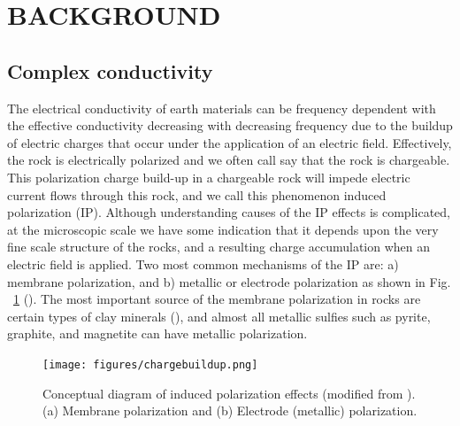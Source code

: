 \documentclass[letterpaper,11pt]{article}
\title{\normalsize}
\begin{document}

\newpage

\tableofcontents
\newpage



\section{BACKGROUND}


\subsection{Complex conductivity}
The electrical conductivity of earth materials can be frequency dependent with the effective conductivity decreasing with decreasing frequency due to the buildup of electric charges that occur under the application of an electric field. Effectively, the rock is electrically polarized and we often call say that the rock is chargeable. This polarization charge build-up in a chargeable rock will impede electric current flows through this rock, and we call this phenomenon  induced polarization (IP). Although understanding causes of the IP effects is complicated, at the microscopic scale we have some indication that it depends upon the very fine scale structure of the rocks, and a resulting charge accumulation when an electric field is applied. Two most common mechanisms of the IP are: a) membrane polarization, and b) metallic or electrode polarization as shown in Fig. ~\ref{Fig:chargebuildup} (\cite{Schön2011}). 
The most important source of the membrane polarization in rocks are certain types of clay minerals (\cite{Katsube}), and almost all metallic sulfies such as pyrite, graphite, and magnetite can have metallic polarization. 
\begin{figure}[htb]
  \centering
  \texttt{[image: figures/chargebuildup.png]}
  \caption{Conceptual diagram of induced polarization effects (modified from \cite{Schön2011}). (a) Membrane polarization and (b) Electrode (metallic) polarization.}
  \label{Fig:chargebuildup}
\end{figure}
\end{document}
